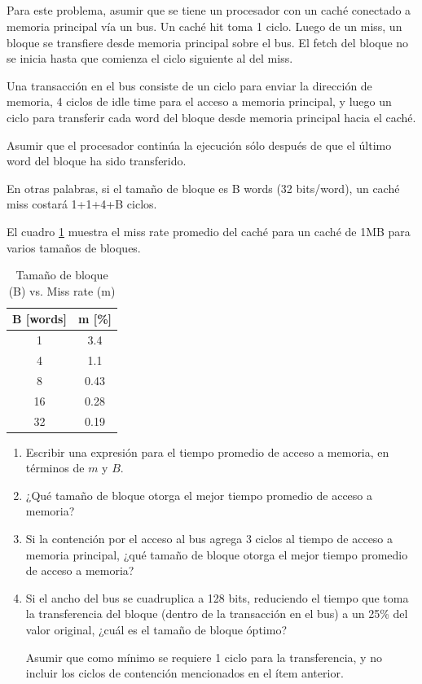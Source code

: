 \subsection{}  
Para este problema, asumir que se tiene un procesador con un caché	conectado a memoria principal vía un bus. Un caché hit toma 1 ciclo. Luego de un miss, un bloque se transfiere desde memoria principal sobre el bus. El fetch del bloque no se inicia hasta que comienza el ciclo siguiente al del miss.

Una transacción en el bus consiste de un ciclo para enviar la dirección de memoria, 4 ciclos de idle time para el acceso a memoria principal, y luego un ciclo para transferir cada word del bloque desde memoria principal hacia el caché.

Asumir que el procesador continúa la ejecución sólo después de que el último word del bloque ha sido transferido.

En otras palabras, si el tamaño de bloque es B words (32 bits/word), un caché miss costará 1+1+4+B ciclos.

El cuadro \ref{tbl:B_vs_m} muestra el miss rate promedio del caché para un caché de 1MB para varios tamaños de bloques.

\begin{table}[h]
\begin{center}
\begin{tabular}{c|c}
B [words] & m [\%]  \\\hline
1  & 3.4  \\
4  & 1.1  \\
8  & 0.43 \\
16 & 0.28 \\
32 & 0.19 \\
\end{tabular}
\caption{Tamaño de bloque (B) vs. Miss rate (m)}
\label{tbl:B_vs_m}
\end{center}
\end{table}

\begin{enumerate}
\item Escribir una expresión para el tiempo promedio de acceso a memoria, en términos de $m$ y $B$.
\item ¿Qué tamaño de bloque otorga el mejor tiempo promedio de acceso a memoria?
\item Si la contención por el acceso al bus agrega 3 ciclos al tiempo de acceso a memoria principal, ¿qué tamaño de bloque otorga el mejor tiempo promedio de acceso a memoria?
\item Si el ancho del bus se cuadruplica a 128 bits, reduciendo el tiempo que toma la transferencia del bloque (dentro de la transacción en el bus) a un 25\% del valor original, ¿cuál es el tamaño de bloque óptimo?

Asumir que como mínimo se requiere 1 ciclo para la transferencia, y no incluir los ciclos de contención mencionados en el ítem anterior.
\end{enumerate}

